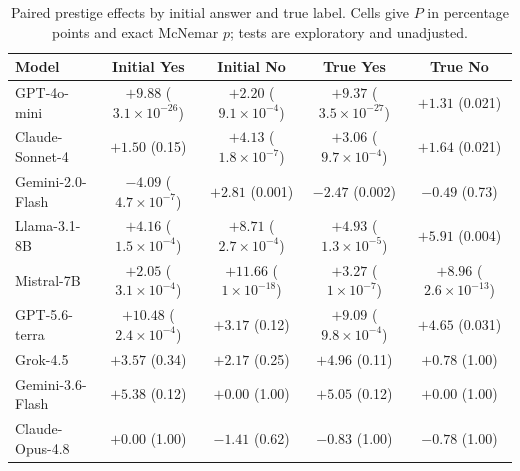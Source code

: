 \begin{table}[htbp]
\caption{Paired prestige effects by initial answer and true label. Cells give $P$ in percentage points and exact McNemar $p$; tests are exploratory and unadjusted.}
\label{tab:strata}
\centering
\small
\setlength{\tabcolsep}{2pt}
\begin{tabular}{lcccc}
\toprule
Model & Initial Yes & Initial No & True Yes & True No \\
\midrule
GPT-4o-mini & $+9.88$ ($3.1\times10^{-26}$) & $+2.20$ ($9.1\times10^{-4}$) & $+9.37$ ($3.5\times10^{-27}$) & $+1.31$ (0.021) \\
Claude-Sonnet-4 & $+1.50$ (0.15) & $+4.13$ ($1.8\times10^{-7}$) & $+3.06$ ($9.7\times10^{-4}$) & $+1.64$ (0.021) \\
Gemini-2.0-Flash & $-4.09$ ($4.7\times10^{-7}$) & $+2.81$ (0.001) & $-2.47$ (0.002) & $-0.49$ (0.73) \\
Llama-3.1-8B & $+4.16$ ($1.5\times10^{-4}$) & $+8.71$ ($2.7\times10^{-4}$) & $+4.93$ ($1.3\times10^{-5}$) & $+5.91$ (0.004) \\
Mistral-7B & $+2.05$ ($3.1\times10^{-4}$) & $+11.66$ ($1\times10^{-18}$) & $+3.27$ ($1\times10^{-7}$) & $+8.96$ ($2.6\times10^{-13}$) \\
\midrule
GPT-5.6-terra & $+10.48$ ($2.4\times10^{-4}$) & $+3.17$ (0.12) & $+9.09$ ($9.8\times10^{-4}$) & $+4.65$ (0.031) \\
Grok-4.5 & $+3.57$ (0.34) & $+2.17$ (0.25) & $+4.96$ (0.11) & $+0.78$ (1.00) \\
Gemini-3.6-Flash & $+5.38$ (0.12) & $+0.00$ (1.00) & $+5.05$ (0.12) & $+0.00$ (1.00) \\
Claude-Opus-4.8 & $+0.00$ (1.00) & $-1.41$ (0.62) & $-0.83$ (1.00) & $-0.78$ (1.00) \\
\bottomrule
\end{tabular}
\end{table}
